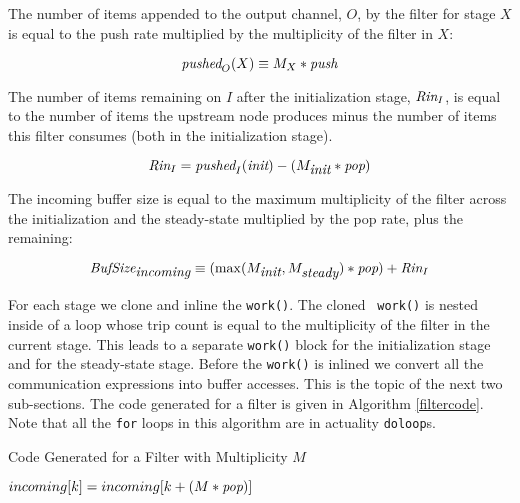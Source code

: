 \documentclass[10pt, letterpaper, onecolumn]{article}
\begin{document}
The number of items appended to the output channel, $O$, by the filter for
stage $X$ is equal to the push rate multiplied by the multiplicity of
the filter in $X$:

\begin{displaymath}
\mbox{\it pushed}_O(X) \equiv M_X * \mbox{\it push}
\end{displaymath} 

The number of items remaining on $I$ after the initialization
stage, $\mbox{\it Rin}_I$, is equal to the number of items the upstream node
produces minus the number of items this filter consumes (both in the
initialization stage).

\begin{displaymath}
  \mbox{\it Rin}_I = \mbox{\it pushed}_I(\mbox{\it init}) - (M_{\mbox{\it init}} * \mbox{\it pop})
\end{displaymath}

The incoming buffer size is equal to the maximum multiplicity of the
filter across the initialization and the steady-state multiplied by
the pop rate, plus the remaining:

\begin{displaymath}
\mbox{\it BufSize}_{\mbox{\it incoming}} \equiv (\max(M_{\mbox{\it init}}, M_{\mbox{\it steady}}) * \mbox{\it pop}) + \mbox{\it Rin}_I
\end{displaymath}

For each stage we clone and inline the {\tt work()}.  The cloned {\tt
work()} is nested inside of a loop whose trip count is equal to the
multiplicity of the filter in the current stage.  This leads to a
separate {\tt work()} block for the initialization stage and for the
steady-state stage.  Before the {\tt work()} is inlined we convert all
the communication expressions into buffer accesses.  This is the topic
of the next two sub-sections. The code generated for a filter is given
in Algorithm \ref{filtercode}.  Note that all the {\tt for} loops in this
algorithm are in actuality {\tt doloop}s.



\begin{algorithm}
\caption{Code Generated for a Filter with Multiplicity $M$}
\label{filtercode}
\begin{algorithmic}
\ENDFOR
{}
\STATE ${incoming}[k] = {incoming}[k + (M * \mbox{\it pop})]$
\ENDFOR 
\end{algorithmic}
\end{algorithm}
\end{document}
